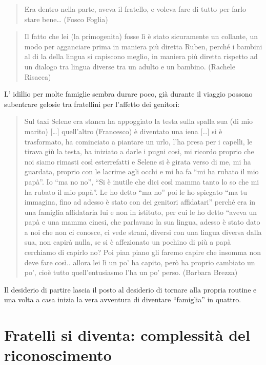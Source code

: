 \documentclass[12pt,oneside,svgnames]{memoir}
\newenvironment{quotationb}%
{\color{maincolor}\begin{leftbar}\begin{quotation}}%
{\end{quotation}\end{leftbar}\ignorespacesafterend}
\begin{document}
\begin{quotationb}
Era dentro nella parte, aveva il fratello, e voleva fare di tutto per
farlo stare bene\ldots{} (Fosco Foglia)
\end{quotationb}

\begin{quotationb}
Il fatto che lei (la primogenita) fosse lì è stato sicuramente un
collante, un modo per agganciare prima in maniera più diretta Ruben,
perché i bambini al di la della lingua si capiscono meglio, in maniera
più diretta rispetto ad un dialogo tra lingua diverse tra un adulto e un
bambino. (Rachele Risacca)
\end{quotationb}

L' idillio per molte famiglie sembra durare poco, già durante il viaggio
possono subentrare gelosie tra fratellini per l'affetto dei genitori:

\begin{quotationb}
Sul taxi Selene era stanca ha appoggiato la testa sulla spalla sua (di
mio marito) {[}\ldots{}{]} quell'altro (Francesco) è diventato una iena
{[}\ldots{}{]} si è trasformato, ha cominciato a piantare un urlo, l'ha
presa per i capelli, le tirava giù la testa, ha iniziato a darle i pugni
così, mi ricordo proprio che noi siamo rimasti così esterrefatti e
Selene si è girata verso di me, mi ha guardata, proprio con le lacrime
agli occhi e mi ha fa ``mi ha rubato il mio papà''. Io ``ma no no'',
``Si è inutile che dici così mamma tanto lo so che mi ha rubato il mio
papà''. Le ho detto ``ma no'' poi le ho spiegato ``ma tu immagina, fino
ad adesso è stato con dei genitori affidatari'' perché era in una
famiglia affidataria lui e non in istituto, per cui le ho detto ``aveva
un papà e una mamma cinesi, che parlavano la sua lingua, adesso è stato
dato a noi che non ci conosce, ci vede strani, diversi con una lingua
diversa dalla sua, non capirà nulla, se si è affezionato un pochino di
più a papà cerchiamo di capirlo no? Poi pian piano gli faremo capire che
insomma non deve fare così.. allora lei lì un po' ha capito, però ha
proprio cambiato un po', cioè tutto quell'entusiasmo l'ha un po' perso.
(Barbara Brezza)
\end{quotationb}

Il desiderio di partire lascia il posto al desiderio di tornare alla
propria routine e una volta a casa inizia la vera avventura di diventare
``famiglia'' in quattro.

\section{Fratelli si diventa: complessità del
riconoscimento}\label{fratelli-si-diventa-complessituxe0-del-riconoscimento}
\end{document}
